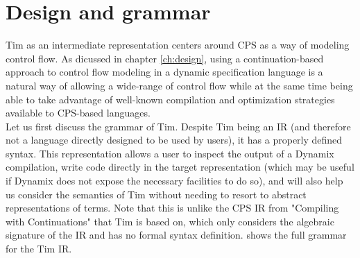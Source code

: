 \section{Design and grammar}
\label{sec:tim_grammar}
Tim as an intermediate representation centers around \acf{CPS} as a way of modeling control flow. As dicussed in chapter \ref{ch:design}, using a continuation-based approach to control flow modeling in a dynamic specification language is a natural way of allowing a wide-range of control flow while at the same time being able to take advantage of well-known compilation and optimization strategies available to \ac{CPS}-based languages.\\

Let us first discuss the grammar of Tim. Despite Tim being an \ac{IR} (and therefore not a language directly designed to be used by users), it has a properly defined syntax. This representation allows a user to inspect the output of a Dynamix compilation, write code directly in the target representation (which may be useful if Dynamix does not expose the necessary facilities to do so), and will also help us consider the semantics of Tim without needing to resort to abstract representations of terms. Note that this is unlike the \ac{CPS} \ac{IR} from "Compiling with Continuations" \cite{Appel1992} that Tim is based on, which only considers the algebraic signature of the IR and has no formal syntax definition.  shows the full grammar for the Tim \ac{IR}.\\

\newcommand{\prodname}[1]{{\scriptstyle <}\textit{#1}{\scriptstyle >}}

